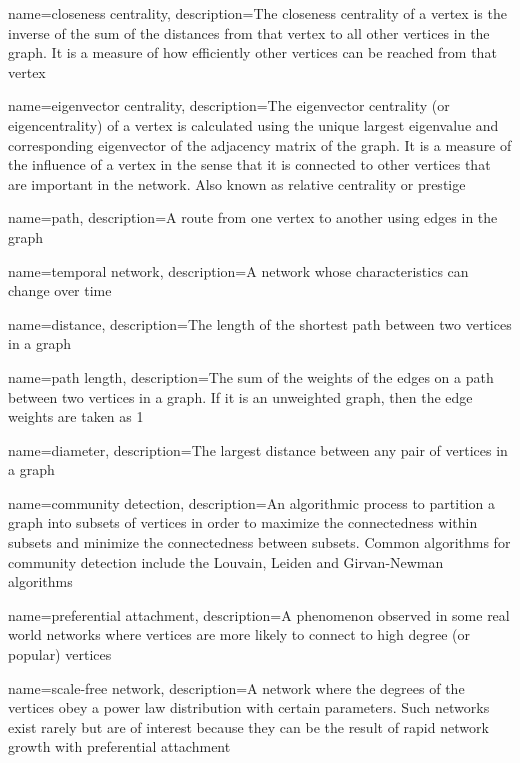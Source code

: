 {
    name={closeness centrality},
    description={The closeness centrality of a vertex is the inverse of the sum of the distances from that vertex to all other vertices in the graph. It is a measure of how efficiently other vertices can be reached from that vertex}
}

{
    name={eigenvector centrality},
    description={The eigenvector centrality (or eigencentrality) of a vertex is calculated using the unique largest eigenvalue  and corresponding eigenvector of the adjacency matrix of the graph. It is a measure of the influence of a vertex in the sense that it is connected to other vertices that are important in the network.  Also known as relative centrality or prestige}
}


{
    name={path},
    description={A route from one vertex to another using edges in the graph}
}

{
    name={temporal network},
    description={A network whose characteristics can change over time}
}

{
    name={distance},
    description={The length of the shortest path between two vertices in a graph}
}

{
    name={path length},
    description={The sum of the weights of the edges on a path between two vertices in a graph.  If it is an unweighted graph, then the edge weights are taken as 1}
}

{
    name={diameter},
    description={The largest distance between any pair of vertices in a graph}
}

{
    name={community detection},
    description={An algorithmic process to partition a graph into subsets of vertices in order to maximize the connectedness within subsets and minimize the connectedness between subsets.  Common algorithms for community detection include the Louvain, Leiden and Girvan-Newman algorithms}
}

{
    name={preferential attachment},
    description={A phenomenon observed in some real world networks where vertices are more likely to connect to high degree (or popular) vertices}
}

{
    name={scale-free network},
    description={A network where the degrees of the vertices obey a power law distribution with certain parameters. Such networks exist rarely but are of interest because they can be the result of rapid network growth with preferential attachment}
}


